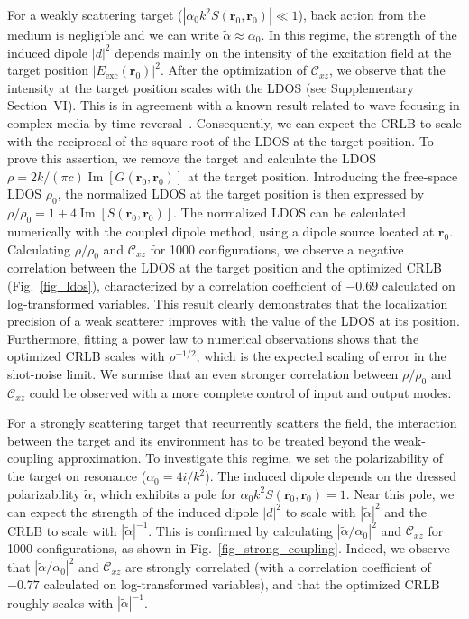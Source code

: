 \documentclass[aps,prl,twocolumn,amsmath,amssymb,superscriptaddress,10pt,nobibnotes]{revtex4-2}
\renewcommand{\bm}[1]{\boldsymbol{\mathbf{#1}}}
\newcommand{\im}{\operatorname{Im}}
\newcommand{\fig}[1]{Fig.~\ref*{#1}}
\begin{document}
For a weakly scattering target ($ |\alpha_0 k^2 S(\bm{r}_0,\bm{r}_0)| \ll 1$), back action from the medium is negligible and we can write $\tilde{\alpha} \approx \alpha_0$. In this regime, the strength of the induced dipole $|d|^2$ depends mainly on the intensity of the excitation field at the target position $|E_{\mathrm{exc}}(\bm{r}_0)|^2$. After the optimization of $\mathcal{C}_{xz}$, we observe that the intensity at the target position scales with the LDOS (see Supplementary Section~VI). This is in agreement with a known result related to wave focusing in complex media by time reversal~\cite{carminati_theory_2007}. Consequently, we can expect the CRLB to scale with the reciprocal of the square root of the LDOS at the target position. To prove this assertion, we remove the target and calculate the LDOS $\rho =2k/(\pi c)\im \left[ G (\bm{r}_0,\bm{r}_0) \right]$ at the target position. Introducing the free-space LDOS $\rho_0$, the normalized LDOS at the target position is then expressed by $\rho/\rho_0=1+4 \im \left[S(\bm{r}_0,\bm{r}_0)\right] $. The normalized LDOS can be calculated numerically with the coupled dipole method, using a dipole source located at $\bm{r}_0$. Calculating $\rho/\rho_0$ and $\mathcal{C}_{xz}$ for 1000 configurations, we observe a negative correlation between the LDOS at the target position and the optimized CRLB (\fig{fig_ldos}), characterized by a correlation coefficient of $-0.69$ calculated on log-transformed variables. This result clearly demonstrates that the localization precision of a weak scatterer improves with the value of the LDOS at its position. Furthermore, fitting a power law to numerical observations shows that the optimized CRLB scales with $\rho^{-1/2}$, which is the expected scaling of error in the shot-noise limit. We surmise that an even stronger correlation between $\rho/\rho_0$ and $\mathcal{C}_{xz}$ could be observed with a more complete control of input and output modes.


For a strongly scattering target that recurrently scatters the field, the interaction between the target and its environment has to be treated beyond the weak-coupling approximation. To investigate this regime, we set the polarizability of the target on resonance ($\alpha_0=4i/k^2$). The induced dipole depends on the dressed polarizability $\tilde{\alpha}$, which exhibits a pole for $\alpha_0 k^2 S(\bm{r}_0,\bm{r}_0)=1$. Near this pole, we can expect the strength of the induced dipole $|d|^2$ to scale with $|\tilde{\alpha}|^2$ and the CRLB to scale with $|\tilde{\alpha}|^{-1}$. This is confirmed by calculating $|\tilde{\alpha}/\alpha_0|^2$ and $\mathcal{C}_{xz}$ for 1000 configurations, as shown in \fig{fig_strong_coupling}. Indeed, we observe that $|\tilde{\alpha}/\alpha_0|^2$ and $\mathcal{C}_{xz}$ are strongly correlated (with a correlation coefficient of $-0.77$ calculated on log-transformed variables), and that the optimized CRLB roughly scales with $|\tilde{\alpha}|^{-1}$.
\end{document}
